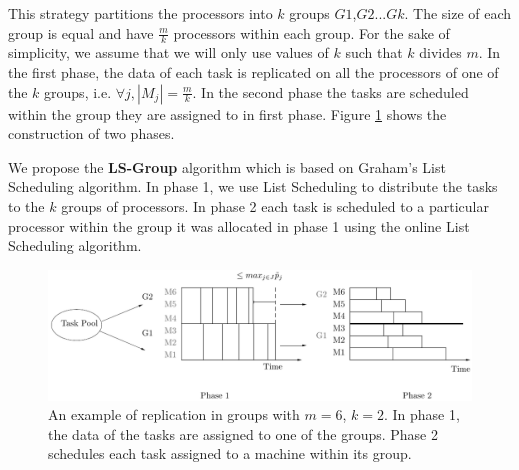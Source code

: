 \label{sec4}
\label{Intro}

 This strategy partitions the processors into $k$ groups
 $G1$,$G2$...$Gk$. The size of each group is equal and have
 $\frac{m}{k}$ processors within each group. For the sake of
 simplicity, we assume that we will only use values of $k$ such that
 $k$ divides $m$. In the first phase, the data of each task is
 replicated on all the processors of one of the $k$ groups,
 i.e. $\forall j, |M_j|= \frac{m}{k}$. In the second phase the tasks
 are scheduled within the group they are assigned to in first phase.
 Figure \ref{fig:Model 3} shows the construction of two phases.
 
 We propose the \textbf{LS-Group} algorithm which is based on Graham's
 List Scheduling algorithm. In phase 1, we use List Scheduling to
 distribute the tasks to the $k$ groups of processors. In phase 2 each
 task is scheduled to a particular processor within the group it was
 allocated in phase 1 using the online List Scheduling algorithm.
 
 \begin{figure}[htp] 
 \centering
 \includegraphics[width=\linewidth]{model3.pdf}
 \caption{An example of replication in groups with $m = 6$, $k = 2$. In
   phase 1, the data of the tasks are assigned to one of the
   groups. Phase 2 schedules each task assigned to a machine within its
   group.}
 \label{fig:Model 3}
 \end{figure}
 
